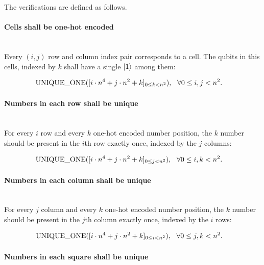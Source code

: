 The verifications are defined as follows.

\paragraph{Cells shall be one-hot encoded}\mbox{}\\

Every $(i,j)$ row and column index pair corresponds to a cell. The qubits in this cells, indexed by $k$ shall have a single $\ket{1}$ among them:

\begin{align*}
    \text{UNIQUE\_ONE}([i\cdot{}n^4 + j\cdot{}n^2 + k]_{0\leq{}k<n^2}), & \hspace{3mm} \forall{}0\leq{}i,j<n^2.
\end{align*}

\paragraph{Numbers in each row shall be unique}\mbox{}\\

For every $i$ row and every $k$ one-hot encoded number position, the $k$ number should be present in the $i$th row exactly once, indexed by the $j$ columns:

\begin{align*}
    \text{UNIQUE\_ONE}([i\cdot{}n^4 + j\cdot{}n^2 + k]_{0\leq{}j<n^2}), & \hspace{3mm} \forall{}0\leq{}i,k<n^2.
\end{align*}

\paragraph{Numbers in each column shall be unique}\mbox{}\\

For every $j$ column and every $k$ one-hot encoded number position, the $k$ number should be present in the $j$th column exactly once, indexed by the $i$ rows:

\begin{align*}
    \text{UNIQUE\_ONE}([i\cdot{}n^4 + j\cdot{}n^2 + k]_{0\leq{}i<n^2}), & \hspace{3mm} \forall{}0\leq{}j,k<n^2.
\end{align*}

\paragraph{Numbers in each square shall be unique}\mbox{}\\

